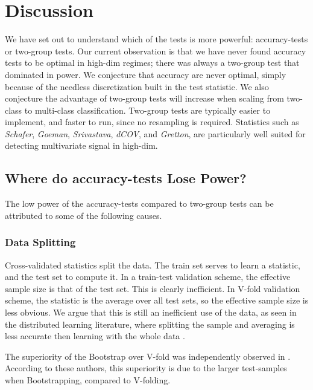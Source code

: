 \documentclass[]{bio}
\begin{document}
\section{Discussion}
\label{sec:discussion}

We have set out to understand which of the tests is more powerful: accuracy-tests or two-group tests. 
Our current observation is that we have never found accuracy tests to be optimal in high-dim regimes; there was always a two-group test that dominated in power.
We conjecture that accuracy are never optimal, simply because of the needless discretization built in the test statistic.
We also conjecture the advantage of two-group tests will increase when scaling from two-class to multi-class classification.
Two-group tests are typically easier to implement, and faster to run, since no resampling is required. 
Statistics such as \emph{Schafer}, \emph{Goeman}, \emph{Srivastava}, \emph{dCOV}, and \emph{Gretton}, are particularly well suited for detecting multivariate signal in high-dim.



\subsection{Where do accuracy-tests Lose Power?}
The low power of the accuracy-tests compared to two-group tests can be attributed to some of the following causes.

\subsubsection{Data Splitting}
Cross-validated statistics split the data.
The train set serves to learn a statistic, and the test set to compute it.
In a train-test validation scheme, the effective sample size is that of the test set.
This is clearly inefficient. 
In V-fold validation scheme, the statistic is the average over all test sets, so the effective sample size is less obvious. 
We argue that this is still an inefficient use of the data, as seen in the distributed learning literature, where splitting the sample and averaging is less accurate then learning with the whole data \citep{rosenblatt2016optimality}.

The superiority of the Bootstrap over V-fold was independently observed in \cite{yu2007two}. 
According to these authors, this superiority is due to the larger test-samples when Bootstrapping, compared to V-folding.
\end{document}
